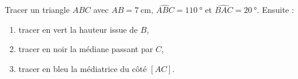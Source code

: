 
\begin{exercice}\label{exosmath-0920}

    Tracer un triangle \( ABC\) avec \( AB=\SI{7}{\centi\meter}\), \( \widehat{ABC}=\SI{110}{\degree}\) et \( \widehat{BAC}=\SI{20}{\degree}\). Ensuite :
    \begin{enumerate}
        \item
            tracer en vert la hauteur issue de \( B\),
        \item
            tracer en noir la médiane passant par \( C\),
        \item
            tracer en bleu la médiatrice du côté \( [AC]\).
    \end{enumerate}

\end{exercice}
